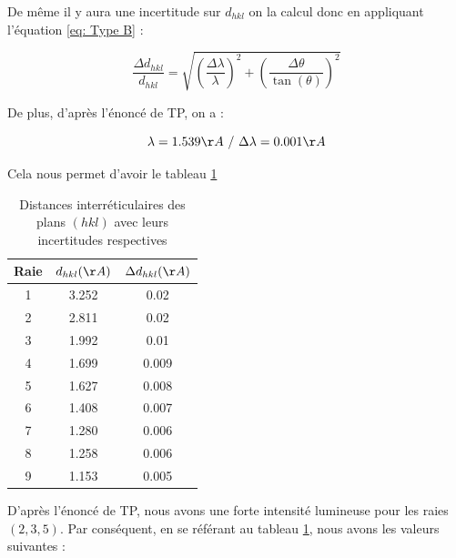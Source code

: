 De même il y aura une incertitude sur $d_{hkl}$ on la calcul donc en appliquant l'équation \ref{eq: Type B} :

\begin{equation} \label{eq: Type B dhkl}
	\frac{\Delta d_{hkl}}{d_{hkl}} = \sqrt{\left ( \frac{\Delta \lambda }{\lambda} \right )^2 + \left ( \frac{\Delta \theta}{\tan(\theta)} \right )^2 }
\end{equation}

De plus, d'après l'énoncé de TP, on a		  :

\begin{equation}
	\lambda = 1.539 \AA \ / \ \Delta \lambda = 0.001 \AA
\end{equation}

\newpage
Cela nous permet d'avoir le tableau \ref{tab:Tableau des dhkl correspondant aux différentes raies}
\begin{table}[h!]
	\centering
	\begin{tabular}{|c|c|c|}
		
		\hline
	Raie &	$ d_{hkl} (\AA) $& $\Delta d_{hkl} (\AA)$  \\ \hline
	 1& 3.252	&         0.02                     \\ \hline
	2& 2.811	&      0.02                         \\ \hline
	3& 1.992	&       0.01                       \\ \hline
	4& 1.699	&         0.009                     \\ \hline
	5& 1.627	&        0.008                       \\ \hline
	6&1.408	&          0.007                     \\ \hline
	7& 1.280	&       0.006                        \\ \hline
	8& 1.258	&       0.006                        \\ \hline
	9& 1.153	&        0.005                       \\ \hline
	\end{tabular}
	\caption{Distances interréticulaires des plans $(h k l)$ avec leurs incertitudes respectives}
	\label{tab:Tableau des dhkl correspondant aux différentes raies}
\end{table}

D'après l'énoncé de TP, nous avons une forte intensité lumineuse pour les raies $(2, 3, 5)$. Par conséquent, en se référant au tableau \ref{tab:Tableau des dhkl correspondant aux différentes raies}, nous avons les valeurs suivantes :

